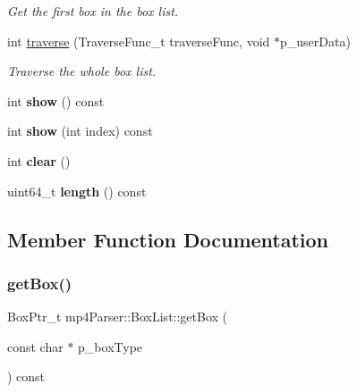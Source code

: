 \begin{DoxyCompactItemize}
\begin{DoxyCompactList}\small\item\em Get the first box in the box list. \end{DoxyCompactList}\item 
int \mbox{\hyperlink{classmp4_parser_1_1_box_list_a24de75849802054ff8d40a12f1120f85}{traverse}} (Traverse\+Func\+\_\+t traverse\+Func, void $\ast$p\+\_\+user\+Data)
\begin{DoxyCompactList}\small\item\em Traverse the whole box list. \end{DoxyCompactList}\item 
\mbox{\label{classmp4_parser_1_1_box_list_a92a1d673426cd0529d42d6e36aff70a5}} 
int {\bfseries show} () const
\item 
\mbox{\label{classmp4_parser_1_1_box_list_a24658953697e507b3d92663372853499}} 
int {\bfseries show} (int index) const
\item 
\mbox{\label{classmp4_parser_1_1_box_list_a477e2897d99578461e78c938955b57de}} 
int {\bfseries clear} ()
\item 
\mbox{\label{classmp4_parser_1_1_box_list_a4a8a5e53fe9c70504fd4831b54ec0923}} 
uint64\+\_\+t {\bfseries length} () const
\end{DoxyCompactItemize}


\subsection{Member Function Documentation}
\mbox{\label{classmp4_parser_1_1_box_list_a0cb719a35dca3955405798beb065c7ce}} 
\subsubsection{\texorpdfstring{getBox()}{getBox()}}
{\footnotesize\ttfamily Box\+Ptr\+\_\+t mp4\+Parser\+::\+Box\+List\+::get\+Box (\begin{DoxyParamCaption}\item[{const char $\ast$}]{p\+\_\+box\+Type }\end{DoxyParamCaption}) const}



